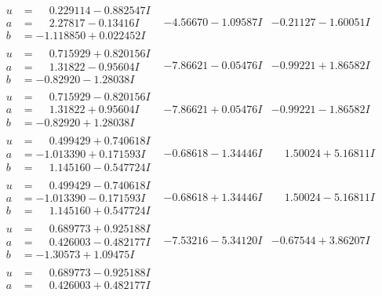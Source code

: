 \documentclass[1p]{elsarticle_modified}
\theoremstyle{definition}
\begin{document}
$$\begin{array}{c|c|c}
 \hline 
\begin{aligned}
u &= \phantom{-}0.229114 - 0.882547 I \\
a &= \phantom{-}2.27817 - 0.13416 I \\
b &= -1.118850 + 0.022452 I\end{aligned}
 & -4.56670 - 1.09587 I & -0.21127 - 1.60051 I \\ \hline\begin{aligned}
u &= \phantom{-}0.715929 + 0.820156 I \\
a &= \phantom{-}1.31822 - 0.95604 I \\
b &= -0.82920 - 1.28038 I\end{aligned}
 & -7.86621 - 0.05476 I & -0.99221 + 1.86582 I \\ \hline\begin{aligned}
u &= \phantom{-}0.715929 - 0.820156 I \\
a &= \phantom{-}1.31822 + 0.95604 I \\
b &= -0.82920 + 1.28038 I\end{aligned}
 & -7.86621 + 0.05476 I & -0.99221 - 1.86582 I \\ \hline\begin{aligned}
u &= \phantom{-}0.499429 + 0.740618 I \\
a &= -1.013390 + 0.171593 I \\
b &= \phantom{-}1.145160 - 0.547724 I\end{aligned}
 & -0.68618 - 1.34446 I & \phantom{-}1.50024 + 5.16811 I \\ \hline\begin{aligned}
u &= \phantom{-}0.499429 - 0.740618 I \\
a &= -1.013390 - 0.171593 I \\
b &= \phantom{-}1.145160 + 0.547724 I\end{aligned}
 & -0.68618 + 1.34446 I & \phantom{-}1.50024 - 5.16811 I \\ \hline\begin{aligned}
u &= \phantom{-}0.689773 + 0.925188 I \\
a &= \phantom{-}0.426003 - 0.482177 I \\
b &= -1.30573 + 1.09475 I\end{aligned}
 & -7.53216 - 5.34120 I & -0.67544 + 3.86207 I \\ \hline\begin{aligned}
u &= \phantom{-}0.689773 - 0.925188 I \\
a &= \phantom{-}0.426003 + 0.482177 I \\

\end{aligned}
\end{array}$$
\end{document}
